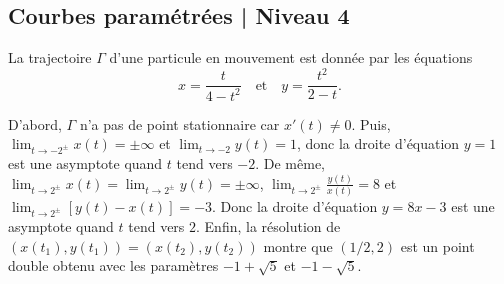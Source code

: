 \subsection{Courbes paramétrées | Niveau 4}

\begin{question}
La trajectoire $\Gamma$ d'une particule en mouvement est donnée par les équations
$$x=\frac{t}{4-t^2}\quad \mbox{et} \quad  y=\frac{t^2}{2-t}.$$
\begin{answers}  
\end{answers}
\begin{explanations}
D'abord, $\Gamma$ n'a pas de point stationnaire car $x'(t)\neq 0$. Puis, $\displaystyle \lim_{t\to -2^{\pm}}x(t)=\pm \infty$ et $\displaystyle \lim_{t\to -2}y(t)=1$, donc la droite d'équation $y=1$ est une asymptote quand $t$ tend vers $-2$. De même, $\displaystyle \lim_{t\to 2^{\pm}}x(t)=\lim_{t\to 2^{\pm}}y(t)=\pm \infty$, $\displaystyle \lim_{t\to 2^{\pm}}\frac{y(t)}{x(t)}=8$ et $\displaystyle \lim_{t\to 2^{\pm}}[y(t)-x(t)]=-3$. Donc la droite d'équation $y=8x-3$ est une asymptote quand $t$ tend vers $2$. Enfin, la résolution de $(x(t_1),y(t_1))=(x(t_2),y(t_2))$ montre que $(1/2,2)$ est un point double obtenu avec les paramètres $-1+\sqrt{5}$ et $-1-\sqrt{5}$.
\end{explanations}
\end{question}

